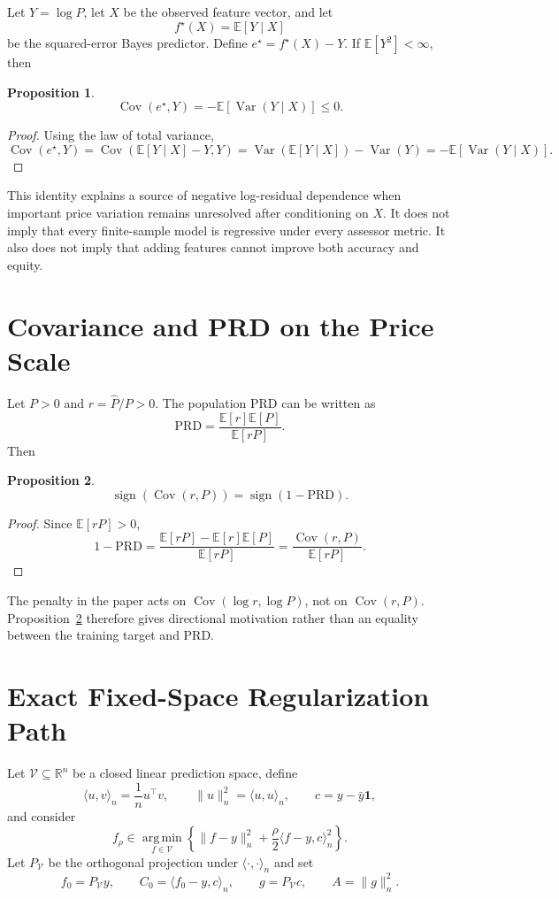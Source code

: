 \documentclass[10pt]{article}
\newtheorem{proposition}{Proposition}
\theoremstyle{definition}
\newcommand{\R}{\mathbb{R}}
\newcommand{\E}{\mathbb{E}}
\newcommand{\Cov}{\operatorname{Cov}}
\newcommand{\Var}{\operatorname{Var}}
\newcommand{\1}{\mathbf{1}}
\newcommand{\Vcal}{\mathcal{V}}
\newcommand{\argminop}{\operatorname*{arg\,min}}
\begin{document}
{{Let $Y=\log P$, let $X$ be the observed feature vector, and let
\[
f^\star(X)=\E[Y\mid X]
\]
be the squared-error Bayes predictor. Define $e^\star=f^\star(X)-Y$. If $\E[Y^2]<\infty$, then
\begin{proposition}
\label{prop:bayes_covariance}
\[
\Cov(e^\star,Y)
=
-\E[\Var(Y\mid X)]
\le 0.
\]
\end{proposition}
\begin{proof}
Using the law of total variance,
\[
\Cov(e^\star,Y)
=
\Cov(\E[Y\mid X]-Y,Y)
=
\Var(\E[Y\mid X])-\Var(Y)
=
-\E[\Var(Y\mid X)].
\]
\end{proof}

This identity explains a source of negative log-residual dependence when important price variation remains unresolved after conditioning on $X$. It does not imply that every finite-sample model is regressive under every assessor metric. It also does not imply that adding features cannot improve both accuracy and equity.

\section{Covariance and PRD on the Price Scale}
\label{app:cov_prd}

Let $P>0$ and $r=\widehat P/P>0$. The population PRD can be written as
\[
\mathrm{PRD}
=
\frac{\E[r]\E[P]}{\E[rP]}.
\]
Then
\begin{proposition}
\label{prop:cov_prd}
\[
\operatorname{sign}\!\left(\Cov(r,P)\right)
=
\operatorname{sign}(1-\mathrm{PRD}).
\]
\end{proposition}
\begin{proof}
Since $\E[rP]>0$,
\[
1-\mathrm{PRD}
=
\frac{\E[rP]-\E[r]\E[P]}{\E[rP]}
=
\frac{\Cov(r,P)}{\E[rP]}.
\]
\end{proof}

The penalty in the paper acts on $\Cov(\log r,\log P)$, not on $\Cov(r,P)$. Proposition~\ref{prop:cov_prd} therefore gives directional motivation rather than an equality between the training target and PRD.

\section{Exact Fixed-Space Regularization Path}
\label{app:theory}

Let $\Vcal\subseteq\R^n$ be a closed linear prediction space, define
\[
\langle u,v\rangle_n=\frac{1}{n}u^\top v,
\qquad
\|u\|_n^2=\langle u,u\rangle_n,
\qquad
c=y-\bar y\1,
\]
and consider
\begin{equation}
\label{eq:path_problem}
f_\rho\in\argminop_{f\in\Vcal}
\left\{
\|f-y\|_n^2
+\frac{\rho}{2}\langle f-y,c\rangle_n^2
\right\}.
\end{equation}
Let $P_{\Vcal}$ be the orthogonal projection under $\langle\cdot,\cdot\rangle_n$ and set
\[
f_0=P_{\Vcal}y,\qquad
C_0=\langle f_0-y,c\rangle_n,\qquad
g=P_{\Vcal}c,\qquad
A=\|g\|_n^2.
\]

}}
\end{document}
